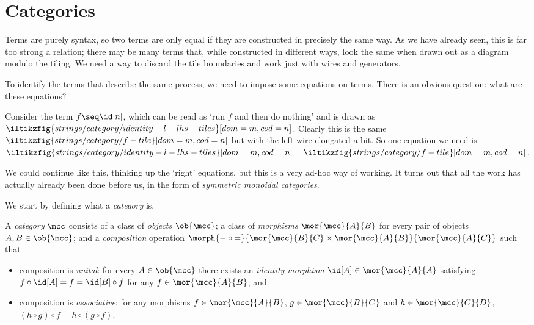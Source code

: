 \section{Categories}

Terms are purely syntax, so two terms are only equal if they are constructed in
precisely the same way.
As we have already seen, this is far too strong a relation; there may be
many terms that, while constructed in different ways, look the same when drawn
out as a diagram modulo the tiling.
We need a way to discard the tile boundaries and work just with
wires and generators.

To identify the terms that describe the same process, we need to impose some
equations on terms.
There is an obvious question: what are these equations?

\begin{example}
    Consider the term \(f \seq \id[n]\), which can be read as `run \(f\) and
    then do nothing' and is drawn as \(
    \iltikzfig{strings/category/identity-l-lhs-tiles}[dom=m,cod=n]
    \).
    Clearly this is the same \(
    \iltikzfig{strings/category/f-tile}[dom=m,cod=n]
    \) but with the left wire elongated a bit.
    So one equation we need is \(
    \iltikzfig{strings/category/identity-l-lhs-tiles}[dom=m,cod=n]
    =
    \iltikzfig{strings/category/f-tile}[dom=m,cod=n]
    \).
\end{example}

We could continue like this, thinking up the `right' equations, but this is a
very ad-hoc way of working.
It turns out that all the work has actually already been done before us, in the
form of \emph{symmetric monoidal categories}.

We start by defining what a \emph{category} is.

\begin{definition}[Category]
    \label{def:category}
    A \emph{category} \(\mcc\) consists of a class of \emph{objects}
    \(\ob{\mcc}\); a class of \emph{morphisms} \(\mor{\mcc}{A}{B}\)
    for every pair of objects \(A, B \in \ob{\mcc}\); and a \emph{composition}
    operation \(
    \morph{
        {-} \circ {=}
    }{
        \mor{\mcc}{B}{C} \times \mor{\mcc}{A}{B}
    }{
        \mor{\mcc}{A}{C}
    }
    \) such that
    \begin{itemize}
        \item composition is \emph{unital}: for every \(
              A \in \ob{\mcc}
              \) there exists an \emph{identity morphism} \(
              \id[A] \in \mor{\mcc}{A}{A}
              \) satisfying \(
              f \circ \id[A] = f = \id[B] \circ f
              \) for any \(
              f \in \mor{\mcc}{A}{B}
              \); and
        \item composition is \emph{associative}: for any morphisms \(
              f \in \mor{\mcc}{A}{B}
              \), \(
              g \in \mor{\mcc}{B}{C}
              \) and \(h \in \mor{\mcc}{C}{D}\), \(
              (h \circ g) \circ f = h \circ (g \circ f).
              \)
    \end{itemize}
\end{definition}

